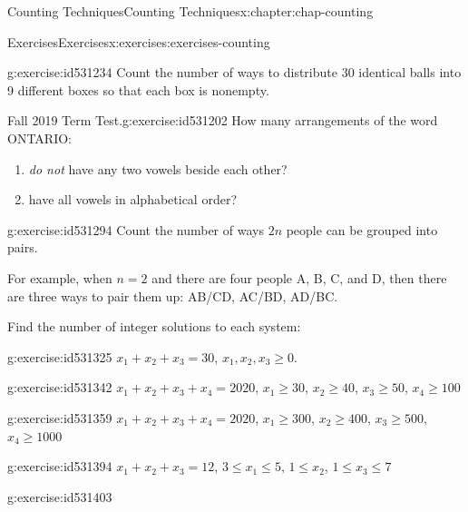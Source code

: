\documentclass[oneside,10pt,]{book}
\numberwithin{equation}{section}
\begin{document}
\begin{chapterptx}{Counting Techniques}{}{Counting Techniques}{}{}{x:chapter:chap-counting}
\begin{exercises-section}{Exercises}{}{Exercises}{}{}{x:exercises:exercises-counting}
\begin{divisionexercise}{17}{}{}{g:exercise:id531234}%
Count the number of ways to distribute 30 identical balls into 9 different boxes so that each box is nonempty.%
\end{divisionexercise}%
\begin{divisionexercise}{18}{Fall 2019 Term Test.}{}{g:exercise:id531202}%
How many arrangements of the word ONTARIO:%
\begin{enumerate}[label=(\alph*)]
\item{}\emph{do not} have any two vowels beside each other?%
\item{}have all vowels in alphabetical order?%
\end{enumerate}
%
\end{divisionexercise}%
\begin{divisionexercise}{19}{}{}{g:exercise:id531294}%
Count the number of ways \(2n\) people can be grouped into pairs.%
\par
For example, when \(n = 2\) and there are four people A, B, C, and D, then there are three ways to pair them up: AB\slash{}CD, AC\slash{}BD, AD\slash{}BC.%
\end{divisionexercise}%
\par\medskip\noindent%
%
Find the number of integer solutions to each system:%
\begin{exercisegroup}
\begin{divisionexerciseeg}{20}{}{}{g:exercise:id531325}%
\(x_1 + x_2 + x_3 = 30\), \(x_1, x_2, x_3 \geq 0\).%
\end{divisionexerciseeg}%
\begin{divisionexerciseeg}{21}{}{}{g:exercise:id531342}%
\(x_1 + x_2 + x_3 + x_4 = 2020\), \(x_1 \geq 30\), \(x_2 \geq 40\), \(x_3 \geq 50\), \(x_4 \geq 100\)%
\end{divisionexerciseeg}%
\begin{divisionexerciseeg}{22}{}{}{g:exercise:id531359}%
\(x_1 + x_2 + x_3 + x_4 = 2020\), \(x_1 \geq 300\), \(x_2 \geq 400\), \(x_3 \geq 500\), \(x_4 \geq 1000\)%
\end{divisionexerciseeg}%
\begin{divisionexerciseeg}{23}{}{}{g:exercise:id531394}%
\(x_1 + x_2 + x_3 = 12\), \(3 \leq x_1 \leq 5\), \(1 \leq x_2\), \(1 \leq x_3 \leq 7\)%
\end{divisionexerciseeg}%
\end{exercisegroup}
\par\medskip\noindent
\begin{divisionexercise}{24}{}{}{g:exercise:id531403}%

\end{divisionexercise}
\end{exercises-section}
\end{chapterptx}
\end{document}
